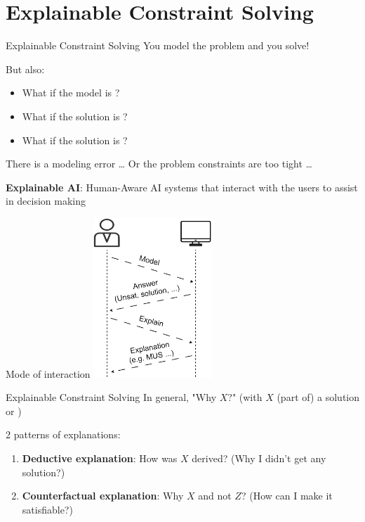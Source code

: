 \documentclass{cons-beamer}
\begin{document}
\section{Explainable Constraint Solving}

\begin{frame}{Explainable Constraint Solving}
  You model the problem and you solve!
  \vfill

  But also:
  \begin{itemize}
    \item What if the model is ?
    \item What if the solution is ?
    \item What if the solution is ?
  \end{itemize}
  \vfill

  There is a modeling error \dots
  Or the problem constraints are too tight \dots
  \vfill

  \textbf{Explainable AI}: Human-Aware AI systems that interact with the users to assist in decision making  
\end{frame}

\begin{frame}{Mode of interaction}
  \centering
  \includegraphics[height=60mm]{images/texpl_img/interaction_figure4.png}
\end{frame}

\begin{frame}{Explainable Constraint Solving}
  In general, "Why $X$?"   (with $X$ (part of) a solution or )

  2 patterns of explanations:
  \vfill

  \begin{enumerate}
    \item \textbf{Deductive explanation}:
          How was $X$ derived? (Why I didn't get any solution?)
          \vfill

    \item \textbf{Counterfactual explanation}:
          Why $X$ and not $Z$? (How can I make it satisfiable?) 
          \vfill
  \end{enumerate}
\end{frame}
\end{document}
